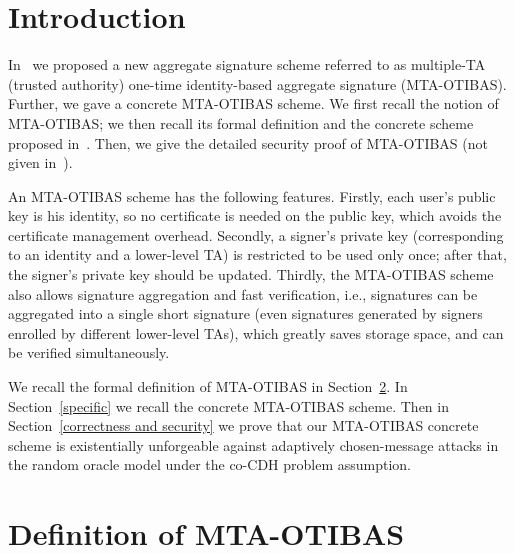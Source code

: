\documentclass[10pt,journal,compsoc]{IEEEtran}
\begin{document}
\IEEEdisplaynontitleabstractindextext

\IEEEpeerreviewmaketitle


\section{Introduction}



In~\cite{IEEE-T-ITS} we proposed a new
aggregate signature scheme
referred to as multiple-TA (trusted authority) one-time
identity-based aggregate signature (MTA-OTIBAS). Further,
we gave a concrete MTA-OTIBAS scheme.
We first recall the notion of MTA-OTIBAS;
we then recall its formal definition and the concrete scheme
proposed in~\cite{IEEE-T-ITS}.
Then, we give the detailed security proof
of MTA-OTIBAS (not given in~\cite{IEEE-T-ITS}).

An MTA-OTIBAS scheme has the following
features. Firstly, each user's public key is his identity, so no
certificate is needed on the public key, which avoids the
certificate management overhead. Secondly, a signer's private key
(corresponding to an identity and a lower-level TA) is restricted to
be used only once; after that, the signer's private key should be
updated. Thirdly,
the MTA-OTIBAS scheme also allows signature
aggregation and fast verification, i.e.,  signatures can be
aggregated into a single short signature (even signatures generated
by signers enrolled by different lower-level TAs), which greatly saves storage space, and can be
verified simultaneously.

We recall the formal definition of MTA-OTIBAS in Section~\ref{IBC}.
In Section~\ref{specific} we recall the concrete MTA-OTIBAS scheme.
Then in Section~\ref{correctness and
security} we prove that
our MTA-OTIBAS concrete scheme is existentially
unforgeable against adaptively chosen-message attacks in
the random oracle model under the co-CDH problem
assumption.


\section{Definition of MTA-OTIBAS}\label{IBC}
\end{document}
